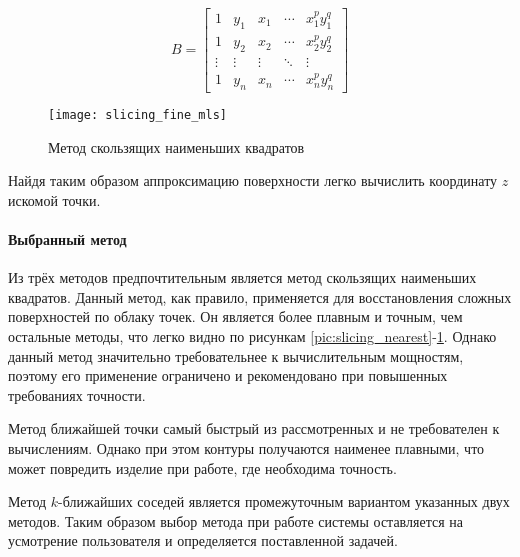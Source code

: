          \begin{equation}
             B = 
             \begin{bmatrix}
                 1 & y_1 & x_1 & \cdots & x_1^p y_1^q\\
                 1 & y_2 & x_2 & \cdots & x_2^p y_2^q\\
                 \vdots & \vdots & \vdots & \ddots & \vdots\\
                 1 & y_n & x_n & \cdots & x_n^p y_n^q
             \end{bmatrix}
         \end{equation}
         
         \begin{figure}[H]
             \centering
             \texttt{[image: slicing\_fine\_mls]}
             \caption{Метод скользящих наименьших квадратов}
             \label{pic:slicing_mls}
         \end{figure}
         
         Найдя таким образом аппроксимацию поверхности легко вычислить координату $ z $ искомой точки.
        
        \paragraph{Выбранный метод}
            Из трёх методов предпочтительным является метод скользящих наименьших квадратов. Данный метод, как правило, применяется для восстановления сложных поверхностей по облаку точек. Он является более плавным и точным, чем остальные методы, что легко видно по рисункам \ref{pic:slicing_nearest}-\ref{pic:slicing_mls}. Однако данный метод значительно требовательнее к вычислительным мощностям, поэтому его применение ограничено и рекомендовано при повышенных требованиях точности. 
            
            Метод ближайшей точки самый быстрый из рассмотренных и не требователен к вычислениям. Однако при этом контуры получаются наименее плавными, что может повредить изделие при работе, где необходима точность.
            
            Метод $ k $-ближайших соседей является промежуточным вариантом указанных двух методов. Таким образом выбор метода при работе системы оставляется на усмотрение пользователя и определяется поставленной задачей.